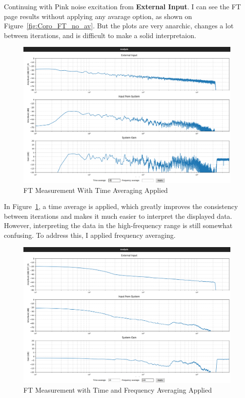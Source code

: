 Continuing with Pink noise excitation from \textbf{External Input}. I can see the FT page results without applying any avarage option, as shown on Figure~\ref{fig:Coro_FT_no_av}. But the plots are very anarchic, changes a lot between iterations, and is difficult to make a solid interpretaion.

\begin{figure}[H]
	\centering
	\includegraphics[width=0.8
	\linewidth]{Figures/Coro_FT_time_av.png}
	\caption{FT Measurement With Time Averaging Applied}
	\label{fig:Coro_FT_time_av}
\end{figure}

In Figure~\ref{fig:Coro_FT_time_av}, a time average is applied, which greatly improves the consistency between iterations and makes it much easier to interpret the displayed data. However, interpreting the data in the high-frequency range is still somewhat confusing. To address this, I applied frequency averaging.

\begin{figure}[H]
	\centering
	\includegraphics[width=0.8
	\linewidth]{Figures/Coro_FT_WITH_av.png}
	\caption{FT Measurement with Time and Frequency Averaging Applied}
	\label{fig:Coro_FT_av}
\end{figure}

